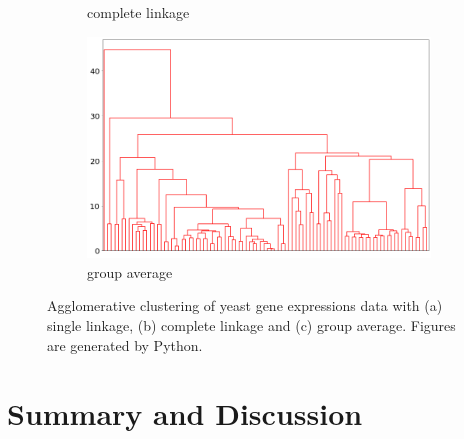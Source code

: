 \begin{figure}[htp]
\begin{subfigure}[b]{0.8\linewidth}
    \caption{complete linkage}
  \end{subfigure}
  \begin{subfigure}[b]{0.8\linewidth}
    \includegraphics[width=\linewidth]{"Part 3 - Learning Systems/Unsupervised Learning/Hierarchical Clustering/figures/Agglomerative-average.png"}
    \caption{group average}
  \end{subfigure}
  \caption{Agglomerative clustering of yeast gene expressions data with (a) single linkage, (b) complete linkage and (c) group average. Figures are generated by Python. }
  \label{fig:example}
\end{figure}

\section{Summary and Discussion}

